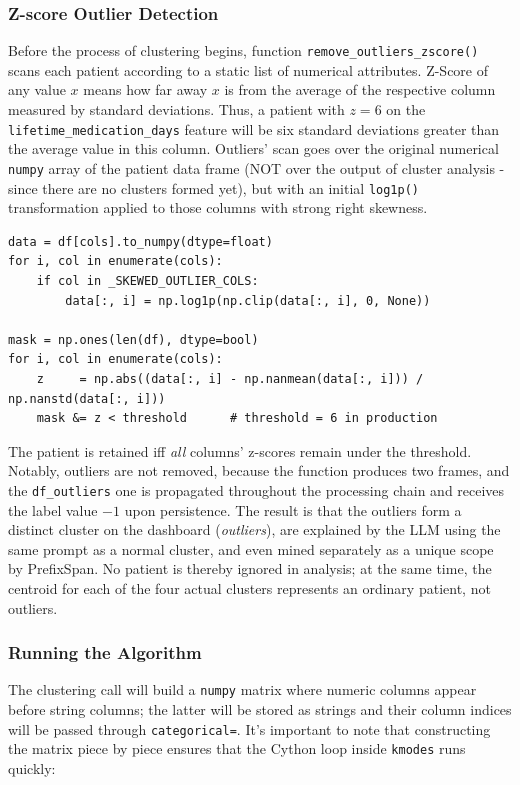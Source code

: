 \subsubsection*{Z-score Outlier Detection}

Before the process of clustering begins, function \texttt{remove\_outliers\_zscore()} scans each patient according to a static list of numerical attributes. Z-Score of any value \(x\) means how far away \(x\) is from the average of the respective column measured by standard deviations. Thus, a patient with \(z=6\) on the \texttt{lifetime\_medication\_days} feature will be six standard deviations greater than the average value in this column. Outliers' scan goes over the original numerical \texttt{numpy} array of the patient data frame (NOT over the output of cluster analysis - since there are no clusters formed yet), but with an initial \texttt{log1p()} transformation applied to those columns with strong right skewness.

\begin{lstlisting}[style=pythonstyle]
data = df[cols].to_numpy(dtype=float)
for i, col in enumerate(cols):
    if col in _SKEWED_OUTLIER_COLS:
        data[:, i] = np.log1p(np.clip(data[:, i], 0, None))

mask = np.ones(len(df), dtype=bool)
for i, col in enumerate(cols):
    z     = np.abs((data[:, i] - np.nanmean(data[:, i])) / np.nanstd(data[:, i]))
    mask &= z < threshold      # threshold = 6 in production
\end{lstlisting}

The patient is retained iff \emph{all} columns' z-scores remain under the threshold. Notably, outliers are not removed, because the function produces two frames, and the \texttt{df\_outliers} one is propagated throughout the processing chain and receives the label value \(-1\) upon persistence. The result is that the outliers form a distinct cluster on the dashboard (\emph{outliers}), are explained by the LLM using the same prompt as a normal cluster, and even mined separately as a unique scope by PrefixSpan. No patient is thereby ignored in analysis; at the same time, the centroid for each of the four actual clusters represents an ordinary patient, not outliers.

\subsubsection*{Running the Algorithm}

The clustering call will build a \texttt{numpy} matrix where numeric columns appear before string columns; the latter will be stored as strings and their column indices will be passed through \texttt{categorical=}. It’s important to note that constructing the matrix piece by piece ensures that the Cython loop inside \texttt{kmodes} runs quickly:

